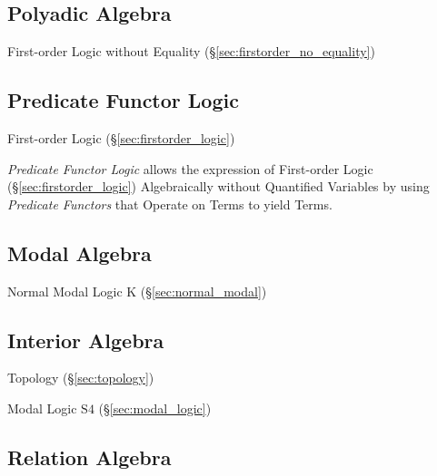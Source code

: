 \subsection{Polyadic Algebra}\label{sec:polyadic_algebra}

First-order Logic without Equality
(\S\ref{sec:firstorder_no_equality})



\subsection{Predicate Functor Logic}\label{sec:pfl}

First-order Logic (\S\ref{sec:firstorder_logic})

\emph{Predicate Functor Logic} allows the expression of First-order
Logic (\S\ref{sec:firstorder_logic}) Algebraically without Quantified
Variables by using \emph{Predicate Functors} that Operate on Terms to
yield Terms.



\subsection{Modal Algebra}\label{sec:modal_algebra}

Normal Modal Logic $\mathrm{K}$ (\S\ref{sec:normal_modal})



\subsection{Interior Algebra}\label{sec:interior_algebra}

Topology (\S\ref{sec:topology})

Modal Logic $\mathrm{S4}$ (\S\ref{sec:modal_logic})



\subsection{Relation Algebra}\label{sec:relation_algebra}

